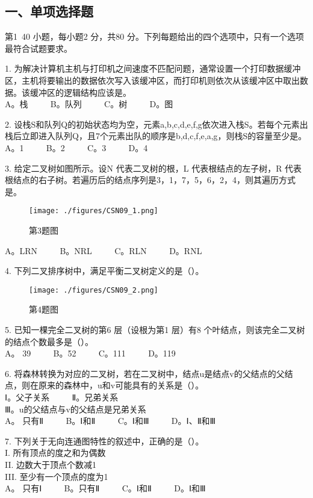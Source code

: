 
\subsection{一、单项选择题}
第1~40 小题，每小题2 分，共80 分。下列每题给出的四个选项中，只有一个选项最符合试题要求。

1. 为解决计算机主机与打印机之间速度不匹配问题，通常设置一个打印数据缓冲区，主机将要输出的数据依次写入该缓冲区，而打印机则依次从该缓冲区中取出数据。该缓冲区的逻辑结构应该是。 \\
A。栈 $\qquad$ B。队列 $\qquad$ C。树 $\qquad$ D。图

2. 设栈S和队列Q的初始状态均为空，元素a,b,c,d,e,f,g依次进入栈S。若每个元素出栈后立即进入队列Q，且7个元素出队的顺序是b,d,c,f,e,a,g，则栈S的容量至少是。 \\
A。1 $\qquad$ B。2 $\qquad$ C。3 $\qquad$ D。4

3. 给定二叉树如图所示。设N 代表二叉树的根，L 代表根结点的左子树，R 代表根结点的右子树。若遍历后的结点序列是3，1，7，5，6，2，4，则其遍历方式是。 \\
\begin{figure}[ht]
\centering
\texttt{[image: ./figures/CSN09\_1.png]}
\caption{第3题图} \label{CSN09_fig1}
\end{figure}
A。LRN $\qquad$ B。NRL $\qquad$ C。RLN $\qquad$ D。RNL

4. 下列二叉排序树中，满足平衡二叉树定义的是（）。\\
\begin{figure}[ht]
\centering
\texttt{[image: ./figures/CSN09\_2.png]}
\caption{第4题图} \label{CSN09_fig2}
\end{figure}

5. 已知一棵完全二叉树的第6 层（设根为第1 层）有8 个叶结点，则该完全二叉树的结点个数最多是（）。 \\
A。 39 $\qquad$ B。52 $\qquad$ C。111 $\qquad$ D。119

6. 将森林转换为对应的二叉树，若在二叉树中，结点u是结点v的父结点的父结点，则在原来的森林中，u和v可能具有的关系是（）。 \\
Ⅰ。父子关系 $\qquad$ Ⅱ。兄弟关系 \\
Ⅲ。u的父结点与v的父结点是兄弟关系 \\
A。 只有Ⅱ $\qquad$ B。Ⅰ和Ⅱ $\qquad$ C。Ⅰ和Ⅲ $\qquad$ D。Ⅰ、Ⅱ和Ⅲ

7. 下列关于无向连通图特性的叙述中，正确的是（）。 \\
I. 所有顶点的度之和为偶数 \\
II. 边数大于顶点个数减1 \\
III. 至少有一个顶点的度为1 \\
A。 只有Ⅰ $\qquad$ B。只有Ⅱ $\qquad$ C。Ⅰ和Ⅱ $\qquad$ D。Ⅰ和Ⅲ

